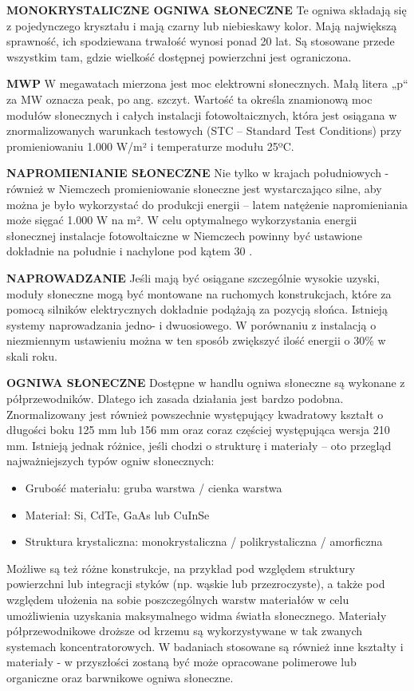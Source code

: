 \documentclass[12pt,a4paper]{article}
\begin{document}
\textbf{MONOKRYSTALICZNE OGNIWA SŁONECZNE}
Te ogniwa składają się z pojedynczego kryształu i mają czarny lub niebieskawy kolor. Mają największą sprawność, ich spodziewana trwałość wynosi ponad 20 lat. Są stosowane przede wszystkim tam, gdzie wielkość dostępnej powierzchni jest ograniczona.


\textbf{MWP}
W megawatach mierzona jest moc elektrowni słonecznych. Małą litera „p“ za MW oznacza peak, po ang. szczyt. Wartość ta określa znamionową moc modułów słonecznych i całych instalacji fotowoltaicznych, która jest osiągana w znormalizowanych warunkach testowych (STC – Standard Test Conditions) przy promieniowaniu 1.000 W/m² i temperaturze modułu 25ºC.


\textbf{NAPROMIENIANIE SŁONECZNE}
Nie tylko w krajach południowych - również w Niemczech promieniowanie słoneczne jest wystarczająco silne, aby można je było wykorzystać do produkcji energii – latem natężenie napromieniania może sięgać 1.000 W na m². W celu optymalnego wykorzystania energii słonecznej instalacje fotowoltaiczne w Niemczech powinny być ustawione dokładnie na południe i nachylone pod kątem 30 \degree.


\textbf{NAPROWADZANIE} 
Jeśli mają być osiągane szczególnie wysokie uzyski, moduły słoneczne mogą być montowane na ruchomych konstrukcjach, które za pomocą silników elektrycznych dokładnie podążają za pozycją słońca. Istnieją systemy naprowadzania jedno- i dwuosiowego. W porównaniu z instalacją o niezmiennym ustawieniu można w ten sposób zwiększyć ilość energii o 30\% w skali roku.


\textbf{OGNIWA SŁONECZNE} 
Dostępne w handlu ogniwa słoneczne są wykonane z półprzewodników. Dlatego ich zasada działania jest bardzo podobna. Znormalizowany jest również powszechnie występujący kwadratowy kształt o długości boku 125 mm lub 156 mm oraz coraz częściej występująca wersja 210 mm. Istnieją jednak różnice, jeśli chodzi o strukturę i materiały – oto przegląd najważniejszych typów ogniw słonecznych:
\begin{itemize}
\item Grubość materiału:	gruba warstwa / cienka warstwa
\item Materiał:	Si, CdTe, GaAs lub CuInSe
\item Struktura krystaliczna:	monokrystaliczna / polikrystaliczna / amorficzna
\end{itemize}
Możliwe są też różne konstrukcje, na przykład pod względem struktury powierzchni lub integracji styków (np. wąskie lub przezroczyste), a także pod względem ułożenia na sobie poszczególnych warstw materiałów w celu umożliwienia uzyskania maksymalnego widma światła słonecznego.
Materiały półprzewodnikowe droższe od krzemu są wykorzystywane w tak zwanych systemach koncentratorowych. W badaniach stosowane są również inne kształty i materiały - w przyszłości zostaną być może opracowane polimerowe lub organiczne oraz barwnikowe ogniwa słoneczne.
\end{document}
